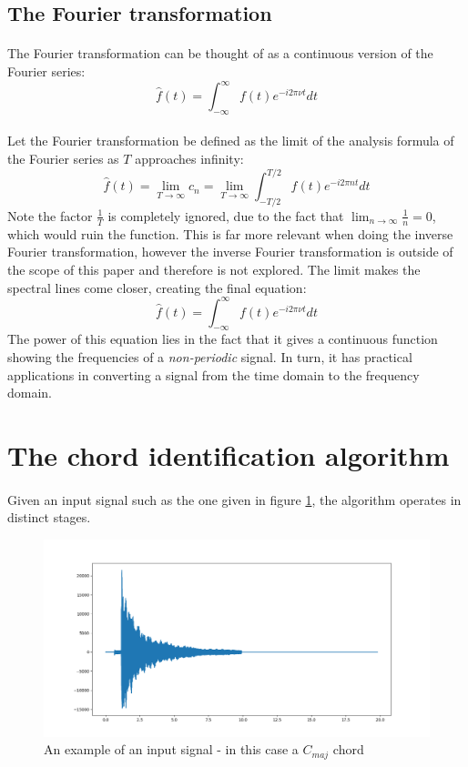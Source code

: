 \documentclass{article}
\begin{document}
\subsection{The Fourier transformation}

\paragraph*{}
The Fourier transformation can be thought of as a continuous version of the 
Fourier series:
$$\hat{f} (t) = \int^{\infty}_{-\infty} f(t) e^{-i 2 \pi \nu t} dt$$

\paragraph*{}
Let the Fourier transformation be defined as the limit of the analysis 
formula of the Fourier series as $T$ approaches infinity:
$$\hat{f} (t) = \lim_{T \rightarrow \infty} c_n = \lim_{T \rightarrow \infty} 
\int_{-T / 2}^{T / 2} f(t) e^{-i 2 \pi n t} dt$$
Note the factor $\frac{1}{T}$ is completely ignored, due to the fact that 
$\lim_{n \rightarrow \infty} \frac{1}{n} = 0$, which would ruin the function. 
This is far more relevant when doing the inverse Fourier transformation, 
however the inverse Fourier transformation is outside of the scope of this 
paper and therefore is not explored. The limit makes the spectral lines come 
closer, creating the final equation:
$$\hat{f} (t) = \int_{-\infty}^{\infty} f(t) e^{-i 2 \pi \nu t} dt$$
The power of this equation lies in the fact that it gives a continuous 
function showing the frequencies of a \textit{non-periodic} signal. In turn, 
it has practical applications in converting a signal from the time domain to 
the frequency domain.

\section{The chord identification algorithm}

\paragraph*{} 
Given an input signal such as the one given in figure \ref{fig:input-signal}, 
the algorithm operates in %
distinct stages.
\begin{figure}[ht] 
	\centering
	\includegraphics[width=\textwidth]{img/input-signal}
	\caption{An example of an input signal - in this case a $C_{maj}$ chord}
	\label{fig:input-signal}
\end{figure}
\end{document}
